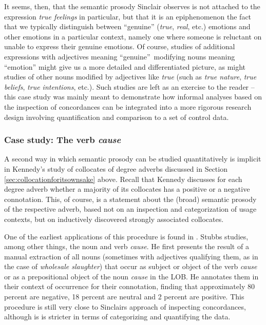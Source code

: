 It seems, then, that the semantic prosody Sinclair observes is not attached to the expression \textit{true feelings} in particular, but that it is an epiphenomenon the fact that we typically distinguish between ``genuine'' (\textit{true}, \textit{real}, etc.) emotions and other emotions in a particular context, namely one where someone is reluctant on unable to express their genuine emotions. Of course, studies of additional expressions with adjectives meaning ``genuine'' modifying nouns meaning ``emotion'' might give us a more detailed and differentiated picture, as might studies of other nouns modified by adjectives like \textit{true} (such as \textit{true nature}, \textit{true beliefs}, \textit{true intentions}, etc.). Such studies are left as an exercise to the reader -- this case study was mainly meant to demonstrate how informal analyses based on the inspection of concordances can be integrated into a more rigorous research design involving quantification and comparison to a set of control data.

\subsubsection{Case study: The verb \textit{cause}}
\label{sec:theverbcause}

A second way in which semantic prosody can be studied quantitatively is implicit in Kennedy's study of collocates of degree adverbs discussed in Section \ref{sec:collocationforitsownsake} above. Recall that Kennedy discusses for each degree adverb whether a majority of its collocates has a positive or a negative connotation. This, of course, is a statement about the (broad) semantic prosody of the respective adverb, based not on an inspection and categorization of usage contexts, but on inductively discovered strongly associated collocates.

One of the earliest applications of this procedure is found in \citet{stubbs_collocations_1995}. Stubbs studies, among other things, the noun and verb \textit{cause}. He first presents the result of a manual extraction of all nouns (sometimes with adjectives qualifying them, as in the case of \textit{wholesale slaughter}) that occur as subject or object of the verb \textit{cause} or as a prepositional object of the noun \textit{cause} in the LOB. He annotates them in their context of occurrence for their connotation, finding that approximately 80 percent are negative, 18 percent are neutral and 2 percent are positive. This procedure is still very close to Sinclairs approach of inspecting concordances, although is is stricter in terms of categorizing and quantifying the data.

